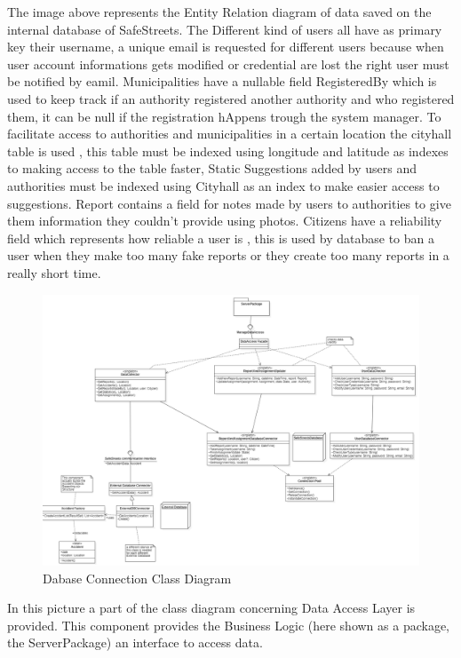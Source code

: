 The image above represents the Entity Relation diagram of data saved on the internal database of SafeStreets. The Different kind of users all have as primary key their username, a unique email is requested for different users because when user account informations gets modified or credential are lost the right user must be notified by eamil. Municipalities have a nullable field RegisteredBy which is used to keep track if an authority registered another authority and who registered them, it can be null if the registration hAppens trough the system manager. To facilitate access to authorities and municipalities in a certain location the cityhall table is used , this table must be indexed using longitude and latitude as indexes to making access to the table faster,
Static Suggestions added by users and authorities must be indexed using Cityhall as an index to make easier access to suggestions.
Report contains a field for notes made by users to authorities to give them information they couldn't provide using photos.
Citizens have a reliability field which represents how reliable a user is , this is used by database to ban a user when they make too many fake reports or they create too many reports in a really short time.
\begin{figure}[H]
\centering
\includegraphics[width=\textwidth]{Images/DatabaseConnectionClassDiagram.png}
\caption{\label{fig:ComWI}Dabase Connection Class Diagram }
\end{figure}
In this picture a part of the class diagram concerning Data Access Layer is provided.
This component provides the Business Logic (here shown as a package, the ServerPackage) an interface to access data.
